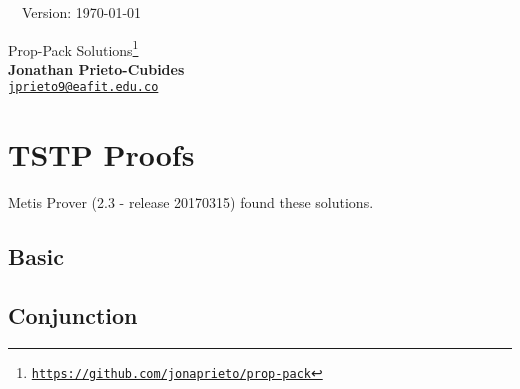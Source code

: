 \documentclass[12pt]{article}
\newcommand{\solutiontstp}[2][c]{}
\begin{document}

\hrulefill\ \ Version: \today\\

\vspace{3mm}
\begin{center}
{\Large Prop-Pack Solutions\footnote{
\href{https://github.com/jonaprieto/prop-pack}{{\color{blue(munsell)}
\texttt{https://github.com/jonaprieto/prop-pack}}}}
}\\
\textbf{Jonathan Prieto-Cubides}\\ %
\href{mailto:jprieto9@eafit.edu.co}{{\color{blue(munsell)}\texttt{jprieto9@eafit.edu.co}}}
\end{center}
\vspace{0.1 cm}

\tableofcontents

\section{TSTP Proofs}
Metis Prover (2.3 - release 20170315) found these solutions.
\subsection{Basic}
\solutiontstp[basic-01.tptp]{problems/basic/basic-01.tstp}
\solutiontstp[basic-02.tptp]{problems/basic/basic-02.tstp}
\solutiontstp[basic-03.tptp]{problems/basic/basic-03.tstp}
\solutiontstp[basic-04.tptp]{problems/basic/basic-04.tstp}

\subsection{Conjunction}
\solutiontstp[conj-01.tptp]{problems/conjunction/conj-01.tstp}
\solutiontstp[conj-02.tptp]{problems/conjunction/conj-02.tstp}
\solutiontstp[conj-03.tptp]{problems/conjunction/conj-03.tstp}
\solutiontstp[conj-04.tptp]{problems/conjunction/conj-04.tstp}
\solutiontstp[conj-05.tptp]{problems/conjunction/conj-05.tstp}
\solutiontstp[conj-06.tptp]{problems/conjunction/conj-06.tstp}
\end{document}
